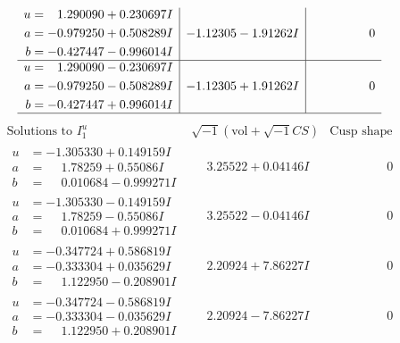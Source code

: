 \documentclass[1p]{elsarticle_modified}
\theoremstyle{definition}
\newcommand{\I}{\sqrt{-1}}
\begin{document}
$$\begin{array}{c|c|c}
\begin{aligned}
u &= \phantom{-}1.290090 + 0.230697 I \\
a &= -0.979250 + 0.508289 I \\
b &= -0.427447 - 0.996014 I\end{aligned}
 & -1.12305 - 1.91262 I & \phantom{-0.000000 } 0 \\ \hline\begin{aligned}
u &= \phantom{-}1.290090 - 0.230697 I \\
a &= -0.979250 - 0.508289 I \\
b &= -0.427447 + 0.996014 I\end{aligned}
 & -1.12305 + 1.91262 I & \phantom{-0.000000 } 0\\
 \hline 
 \end{array}$$\newpage$$\begin{array}{c|c|c}  
\text{Solutions to }I^u_{1}& \I (\text{vol} + \sqrt{-1}CS) & \text{Cusp shape}\\
 \hline 
\begin{aligned}
u &= -1.305330 + 0.149159 I \\
a &= \phantom{-}1.78259 + 0.55086 I \\
b &= \phantom{-}0.010684 - 0.999271 I\end{aligned}
 & \phantom{-}3.25522 + 0.04146 I & \phantom{-0.000000 } 0 \\ \hline\begin{aligned}
u &= -1.305330 - 0.149159 I \\
a &= \phantom{-}1.78259 - 0.55086 I \\
b &= \phantom{-}0.010684 + 0.999271 I\end{aligned}
 & \phantom{-}3.25522 - 0.04146 I & \phantom{-0.000000 } 0 \\ \hline\begin{aligned}
u &= -0.347724 + 0.586819 I \\
a &= -0.333304 + 0.035629 I \\
b &= \phantom{-}1.122950 - 0.208901 I\end{aligned}
 & \phantom{-}2.20924 + 7.86227 I & \phantom{-0.000000 } 0 \\ \hline\begin{aligned}
u &= -0.347724 - 0.586819 I \\
a &= -0.333304 - 0.035629 I \\
b &= \phantom{-}1.122950 + 0.208901 I\end{aligned}
 & \phantom{-}2.20924 - 7.86227 I & \phantom{-0.000000 } 0 \\ \hline\begin{aligned}

\end{aligned}
\end{array}$$
\end{document}

